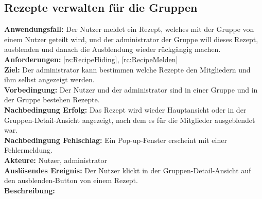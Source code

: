 \documentclass[parskip=full]{scrartcl}
\begin{document}
\subsection{Rezepte verwalten für die Gruppen}
\textbf{Anwendungsfall:} Der Nutzer meldet ein Rezept, welches mit der Gruppe von einem Nutzer geteilt wird, und der \Gls{administrator} der Gruppe will dieses Rezept, ausblenden und danach die Ausblendung wieder rückgängig machen.\\
\textbf{Anforderungen:} \ref{rs:RecipeHiding}, \ref{rc:RecipeMelden}\\
\textbf{Ziel:} Der \Gls{administrator} kann bestimmen welche Rezepte den Mitgliedern und ihm selbst angezeigt werden.\\
\textbf{Vorbedingung:} Der Nutzer und der \Gls{administrator} sind in einer Gruppe und in der Gruppe bestehen Rezepte.\\
\textbf{Nachbedingung Erfolg:} Das Rezept wird wieder Hauptansicht oder in der Gruppen-Detail-Ansicht angezeigt, nach dem es für die Mitglieder ausgeblendet war.\\
\textbf{Nachbedingung Fehlschlag:} Ein Pop-up-Fenster erscheint mit einer Fehlermeldung.\\
\textbf{Akteure:} Nutzer, \Gls{administrator}  \\
\textbf{Auslösendes Ereignis:} Der Nutzer klickt in der Gruppen-Detail-Ansicht auf den ausblenden-Button von einem Rezept.\\
\textbf{Beschreibung:}
\end{document}
